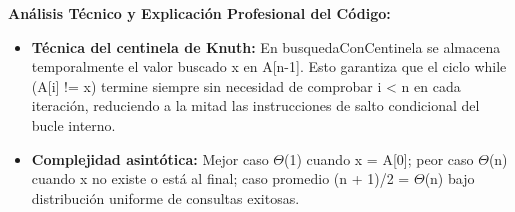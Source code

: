\documentclass[11pt,letterpaper]{article}
\begin{document}
\noindent\textbf{\color{ipnguinda}Análisis Técnico y Explicación Profesional del Código:}\par\vspace{-2pt}
\begin{itemize}
\setlength{\itemsep}{2pt}\setlength{\parskip}{0pt}
  \item \textbf{Técnica del centinela de Knuth: }En busquedaConCentinela se almacena temporalmente el valor buscado x en A[n-1]. Esto garantiza que el ciclo while (A[i] != x) termine siempre sin necesidad de comprobar i < n en cada iteración, reduciendo a la mitad las instrucciones de salto condicional del bucle interno.
  \item \textbf{Complejidad asintótica: }Mejor caso $\Theta$(1) cuando x = A[0]; peor caso $\Theta$(n) cuando x no existe o está al final; caso promedio (n + 1)/2 = $\Theta$(n) bajo distribución uniforme de consultas exitosas.
\end{itemize}
\end{document}
